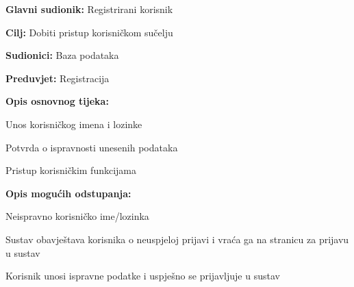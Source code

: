 \noindent {}
\begin{packed_item}
	
	\item \textbf{Glavni sudionik: }Registrirani korisnik
	\item  \textbf{Cilj:} Dobiti pristup korisničkom sučelju
	\item  \textbf{Sudionici:} Baza podataka
	\item  \textbf{Preduvjet:}  Registracija
	\item  \textbf{Opis osnovnog tijeka:}
	
	\item[] \begin{packed_enum}
		
		\item Unos korisničkog imena i lozinke
		\item Potvrda o ispravnosti unesenih podataka
		\item Pristup korisničkim funkcijama

	\end{packed_enum}
	
	\item  \textbf{Opis mogućih odstupanja:}
	
	\item[] \begin{packed_item}
		
		\item[2.a] Neispravno korisničko ime/lozinka
		\item[] \begin{packed_enum}
			
			\item Sustav obavještava korisnika o neuspjeloj prijavi i vraća ga na stranicu za prijavu u sustav
			\item Korisnik unosi ispravne podatke i uspješno se prijavljuje u sustav
			
		\end{packed_enum}
		
	\end{packed_item}
\end{packed_item}

